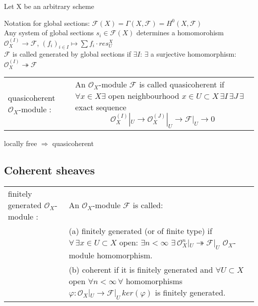 \documentclass[a4paper, 12pt]{article}
\newcommand{\caf}{\mathcal{F}}
\newcommand{\oxmod}{$\mathcal{O}_X$-module }
\newcommand{\ox}{\mathcal{O}_X}
\begin{document}
Let X be an arbitrary scheme

Notation for global sections:
$\caf(X) = \Gamma(X, \caf) = H^0(X,\caf)$
\\

Any system of global sections $s_i \in \caf(X)$ determines a homomorohism $\ox^{(I)}\longrightarrow\caf$, $(f_i)_{i\in I }\longmapsto \sum f_i \cdot  res^{X}_{U}$\\

$\caf$ is called generated by global sections if $\exists I $: $\exists$ a surjective homomorphism:  $\ox^{(I)}\twoheadrightarrow \caf$ 
\\

\begin{tabular}{p{4cm} p{12cm}}


quasicoherent \oxmod: & An \oxmod $\caf$ is called quasicoherent if $\forall x\in X \exists$ open neighbourhood $x\in U \subset X\,  \exists I\, \exists J\, \exists $ exact sequence
  \[
\ox^{(I)}|_U \longrightarrow \ox^{(J)}|_U \longrightarrow \caf|_U \longrightarrow 0
\]
\\
\end{tabular}


locally free $\Longrightarrow$ quasicoherent





\subsection{Coherent sheaves}

\begin{tabular}{p{4cm} p{12cm}}



finitely generated \oxmod : & An \oxmod $\caf$ is called: \\
  & (a) finitely generated (or of finite type) if $\forall\,\exists x\in U \subset X $
  open:
  $\exists n < \infty$ $\exists \, \ox^n|_U \twoheadrightarrow \caf|_U$  \oxmod  homomorphism.
\\
&(b) coherent if it is finitely generated and $\forall U \subset X $ open $\forall n < \infty \, \forall$
homomorphisms $\varphi : \ox|_U \longrightarrow \caf|_U \, ker(\varphi)$ is
finitely generated. \\
\end{tabular}

\\



  
  
\end{document}
